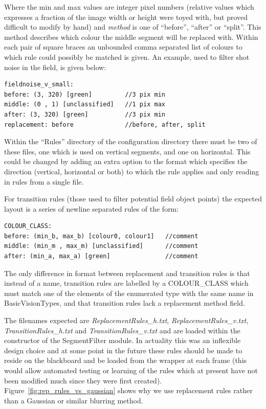 \documentclass[]{report}
\begin{document}
Where the min and max values are integer pixel numbers (relative values which expresses a fraction of the image width or height were toyed with, but proved difficult to modify by hand) and \emph{method} is one of ``before'', ``after'' or ``split''. This method describes which colour the middle segment will be replaced with. Within each pair of square braces an unbounded comma separated list of colours to which rule could possibly be matched is given.  An example, used to filter shot noise in the field, is given below:
\begin{verbatim}
fieldnoise_v_small:
before: (3, 320) [green]         //3 pix min
middle: (0 , 1) [unclassified]   //1 pix max
after: (3, 320) [green]          //3 pix min
replacement: before              //before, after, split
\end{verbatim}

Within the ``Rules'' directory of the configuration directory there must be two of these files, one which is used on vertical segments, and one on horizontal. This could be changed by adding an extra option to the format which specifies the direction (vertical, horizontal or both) to which the rule applies and only reading in rules from a single file.

For transition rules (those used to filter potential field object points) the expected layout is a series of newline separated rules of the form:

\begin{verbatim}
COLOUR_CLASS:
before: (min_b, max_b) [colour0, colour1]   //comment
middle: (min_m , max_m) [unclassified]      //comment
after: (min_a, max_a) [green]               //comment
\end{verbatim}

The only difference in format between replacement and transition rules is that instead of a name, transition rules are labelled by a COLOUR\_CLASS which must match one of the elements of the enumerated type with the same name in BasicVisionTypes, and that transition rules lack a replacement method field.

The filenames expected are \emph{ReplacementRules\_h.txt}, \emph{ReplacementRules\_v.txt}, \emph{TransitionRules\_h.txt} and \emph{TransitionRules\_v.txt} and are loaded within the constructor of the SegmentFilter module. In actuality this was an inflexible design choice and at some point in the future these rules should be made to reside on the blackboard and be loaded from the wrapper at each frame (this would allow automated testing or learning of the rules which at present have not been modified much since they were first created). Figure~\ref{fig:rep_rules_vs_gaussian} shows why we use replacement rules rather than a Gaussian or similar blurring method.
\end{document}
